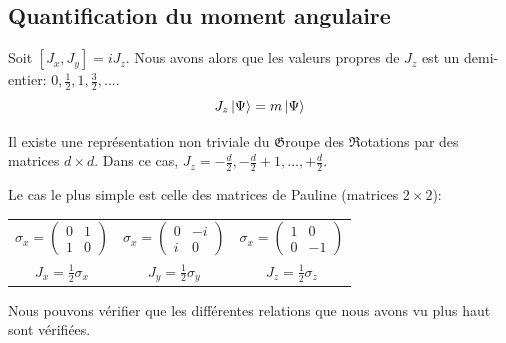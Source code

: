 \documentclass[../notesdecours.tex]{subfiles}
\begin{document}
\subsection{Quantification du moment angulaire}
\begin{theorem}
Soit $[J_x,J_y] = iJ_z$. Nous avons alors que les valeurs propres de $J_z$ est un demi-entier: $0,\frac{1}{2}, 1, \frac{3}{2}, ...$.
\begin{equation*}
J_z \ket{\Psi} = m\ket{\Psi}
\end{equation*}
\end{theorem}
\begin{theorem}
Il existe une représentation non triviale du $\mathfrak{G}$roupe des $\mathfrak{R}$otations par des matrices $d\times d$. Dans ce cas, $J_z = -\frac{d}{2}, -\frac{d}{2}+1,...,+\frac{d}{2}$.
\end{theorem}
\begin{exemple}
Le cas le plus simple est celle des matrices de Pauline (matrices $2\times 2$):
\begin{center}
\begin{tabular}{c|c|c}
$\sigma_x = \begin{pmatrix}
0 & 1\\
1 & 0
\end{pmatrix}$ & $\sigma_x = \begin{pmatrix}
0 & -i\\
i & 0
\end{pmatrix}$ & $\sigma_x = \begin{pmatrix}
1 & 0\\
0 & -1
\end{pmatrix}$\\
$J_x = \frac{1}{2}\sigma_x$ & $J_y = \frac{1}{2}\sigma_y$ & $J_z = \frac{1}{2}\sigma_z$
\end{tabular}
\end{center}
Nous pouvons vérifier que les différentes relations que nous avons vu plus haut sont vérifiées.
\end{exemple}
\end{document}
